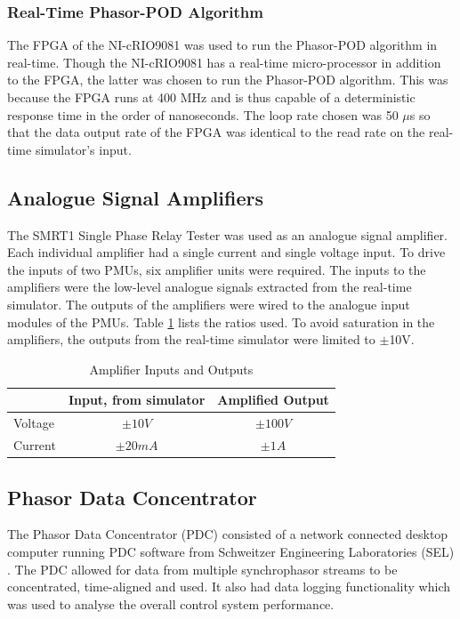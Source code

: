 \documentclass[conference]{IEEEtran}
\begin{document}
\subsubsection*{Real-Time Phasor-POD Algorithm} The FPGA of the NI-cRIO9081 was used to run the Phasor-POD algorithm in real-time. Though the NI-cRIO9081 has a real-time micro-processor in addition to the FPGA, the latter was chosen to run the Phasor-POD algorithm. This was because the FPGA runs at 400 MHz and is thus capable of a deterministic response time in the order of nanoseconds. The loop rate chosen was 50 $\mu$s so that the data output rate of the FPGA was identical to the read rate on the real-time simulator's input.

\subsection{Analogue Signal Amplifiers}
The SMRT1 Single Phase Relay Tester \cite{Megger} was used as an analogue signal amplifier. Each individual amplifier had a single current and single voltage input. To drive the inputs of two PMUs, six amplifier units were required. The inputs to the amplifiers were the low-level analogue signals extracted from the real-time simulator. The outputs of the amplifiers were wired to the analogue input modules of the PMUs. Table \ref{AmplifierTable} lists the ratios used. To avoid saturation in the amplifiers, the outputs from the real-time simulator were limited to $\pm$10V. 

\begin{table}[!ht]
\caption{Amplifier Inputs and Outputs}\label{AmplifierTable}
\begin{center}
\begin{tabular}{|l|c|c|}
\hline \textbf{} & \textbf{Input, from simulator} & \textbf{Amplified Output} \\
\hline Voltage &$\pm10 V$&$\pm 100 V$\\ 
\hline Current & $\pm 20 mA$ & $\pm 1 A$\\ 
\hline 
\end{tabular}
\end{center}
\end{table} 

\subsection{Phasor Data Concentrator}
The Phasor Data Concentrator (PDC) consisted of a network connected desktop computer running PDC software from Schweitzer Engineering Laboratories (SEL) \cite{SEL}. The PDC allowed for data from multiple synchrophasor streams to be concentrated, time-aligned and used. It also had data logging functionality which was used to analyse the overall control system performance.
\end{document}
